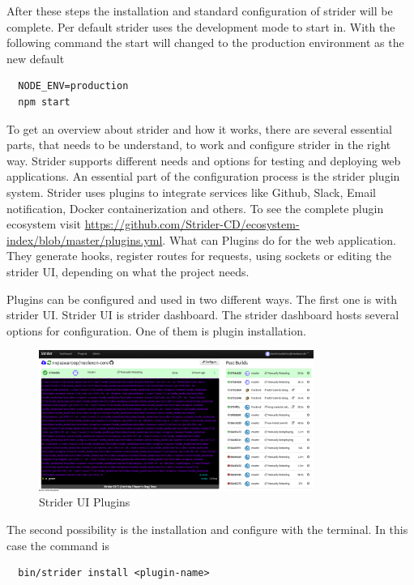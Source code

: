 After these steps the installation and standard configuration of strider will be complete. Per default strider uses the development mode to start in.
With the following command the start will changed to the production environment as the new default

\begin{lstlisting}
  NODE_ENV=production
  npm start
\end{lstlisting}

To get an overview about strider and how it works, there are several essential parts, that needs to be understand, to work and configure
strider in the right way. Strider supports different needs and options for testing and deploying web applications. An essential part of
the configuration process is the strider plugin system. Strider uses plugins to integrate services like Github, Slack, Email
notification, Docker containerization and others. To see the complete plugin ecosystem visit \url{https://github.com/Strider-CD/ecosystem-index/blob/master/plugins.yml}.
What can Plugins do for the web application. They generate hooks, register routes for requests, using sockets or editing the strider
UI, depending on what the project needs.

Plugins can be configured and used in two different ways. The first one is with strider UI. Strider UI is strider dashboard.
The strider dashboard hosts several options for configuration. One of them is plugin installation.

\begin{figure}[h!]
  \centering
  \includegraphics[width=0.8\textwidth]{images/striderUI.png}
  \caption{Strider UI Plugins}
\end{figure}

The second possibility is the installation and configure with the terminal. In this case the command is

\begin{lstlisting}
  bin/strider install <plugin-name>
\end{lstlisting}

